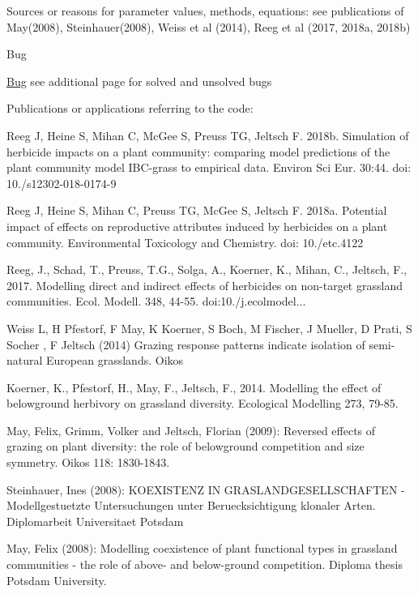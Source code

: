\begin{DoxyParagraph}{Sources or reasons for parameter values, methods, equations\+:}
see publications of May(2008), Steinhauer(2008), Weiss et al (2014), Reeg et al (2017, 2018a, 2018b)
\end{DoxyParagraph}
\begin{DoxyRefDesc}{Bug}
\item[\mbox{\hyperlink{bug__bug000001}{Bug}}]see additional page for solved and unsolved bugs\end{DoxyRefDesc}


\begin{DoxyParagraph}{Publications or applications referring to the code\+:}

\begin{DoxyItemize}
\item Reeg J, Heine S, Mihan C, Mc\+Gee S, Preuss TG, Jeltsch F. 2018b. Simulation of herbicide impacts on a plant community\+: comparing model predictions of the plant community model I\+B\+C-\/grass to empirical data. Environ Sci Eur. 30\+:44. doi\+: 10./s12302-\/018-\/0174-\/9
\item Reeg J, Heine S, Mihan C, Preuss TG, Mc\+Gee S, Jeltsch F. 2018a. Potential impact of effects on reproductive attributes induced by herbicides on a plant community. Environmental Toxicology and Chemistry. doi\+: 10./etc.4122
\item Reeg, J., Schad, T., Preuss, T.\+G., Solga, A., Koerner, K., Mihan, C., Jeltsch, F., 2017. Modelling direct and indirect effects of herbicides on non-\/target grassland communities. Ecol. Modell. 348, 44-\/55. doi\+:10./j.ecolmodel...
\item Weiss L, H Pfestorf, F May, K Koerner, S Boch, M Fischer, J Mueller, D Prati, S Socher , F Jeltsch (2014) Grazing response patterns indicate isolation of semi-\/natural European grasslands. Oikos
\item Koerner, K., Pfestorf, H., May, F., Jeltsch, F., 2014. Modelling the effect of belowground herbivory on grassland diversity. Ecological Modelling 273, 79-\/85.
\item May, Felix, Grimm, Volker and Jeltsch, Florian (2009)\+: Reversed effects of grazing on plant diversity\+: the role of belowground competition and size symmetry. Oikos 118\+: 1830-\/1843.
\item Steinhauer, Ines (2008)\+: K\+O\+E\+X\+I\+S\+T\+E\+NZ IN G\+R\+A\+S\+L\+A\+N\+D\+G\+E\+S\+E\+L\+L\+S\+C\+H\+A\+F\+T\+EN -\/ Modellgestuetzte Untersuchungen unter Beruecksichtigung klonaler Arten. Diplomarbeit Universitaet Potsdam
\item May, Felix (2008)\+: Modelling coexistence of plant functional types in grassland communities -\/ the role of above-\/ and below-\/ground competition. Diploma thesis Potsdam University. 
\end{DoxyItemize}
\end{DoxyParagraph}
